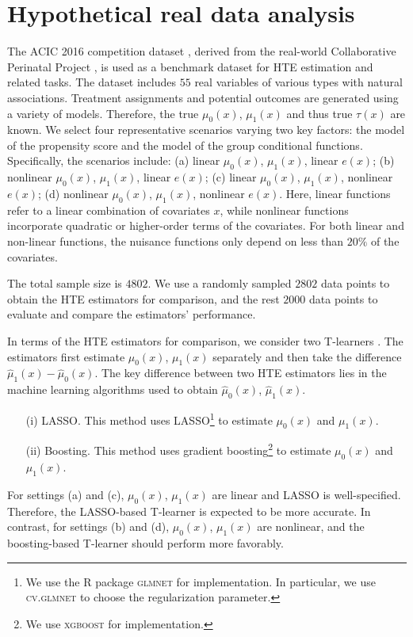 \documentclass{article}
\theoremstyle{plain}
\theoremstyle{definition}
\theoremstyle{plain}
\begin{document}
\section{Hypothetical real data analysis}\label{sec:simulation}

The ACIC 2016 competition dataset \parencite{dorie2019automated}, derived from the real-world Collaborative Perinatal Project \parencite{niswander1972women}, is used as a benchmark dataset for HTE estimation and related tasks. 
The dataset includes $55$ real variables of various types with natural associations. 
Treatment assignments and potential outcomes are generated using a variety of models. 
Therefore, the true $\mu_0(x)$, $\mu_1(x)$ and thus true $\tau(x)$ are known.
We select four representative scenarios varying two key factors: the model of the propensity score and the model of the group conditional functions. 
Specifically, the scenarios include: (a) linear $\mu_0(x)$, $\mu_1(x)$, linear $e(x)$; (b) nonlinear $\mu_0(x)$, $\mu_1(x)$, linear $e(x)$; (c) linear $\mu_0(x)$, $\mu_1(x)$, nonlinear $e(x)$; (d) nonlinear $\mu_0(x)$, $\mu_1(x)$, nonlinear $e(x)$.
Here, linear functions refer to a linear combination of covariates $x$, while nonlinear functions incorporate quadratic or higher-order terms of the covariates. 
For both linear and non-linear functions, the nuisance functions only depend on less than $20\%$ of the covariates.


The total sample size is $4802$. We use a randomly sampled $2802$ data points to obtain the HTE estimators for comparison, and the rest $2000$ data points to evaluate and compare the estimators' performance.


In terms of the HTE estimators for comparison, we consider two T-learners \parencite{Kunzel4156}.
The estimators first estimate $\mu_0(x)$, $\mu_1(x)$ separately and then take the difference $\hat{\mu}_1(x) - \hat{\mu}_0(x)$.
The key difference between two HTE estimators lies in the machine learning algorithms used to obtain $\hat{\mu}_0(x)$, $\hat{\mu}_1(x)$. 
\begin{itemize}
    \item [(i)] LASSO. This method uses LASSO\footnote{We use the R package \textsc{glmnet} for implementation. In particular, we use \textsc{cv.glmnet} to choose the regularization parameter.} to estimate $\mu_0(x)$ and $\mu_1(x)$.
    \item [(ii)] Boosting. This method uses gradient boosting\footnote{We use \textsc{xgboost} for implementation.} to estimate $\mu_0(x)$ and $\mu_1(x)$.
\end{itemize}
For settings (a) and (c), $\mu_0(x)$, $\mu_1(x)$ are linear and LASSO is well-specified. Therefore, the LASSO-based T-learner is expected to be more accurate. 
In contrast, for settings (b) and (d), $\mu_0(x)$, $\mu_1(x)$ are nonlinear, and the boosting-based T-learner should perform more favorably.
\end{document}

